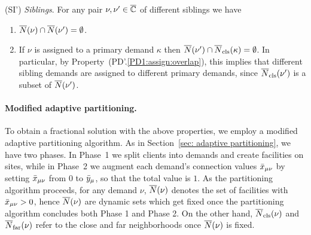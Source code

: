 \begin{description}
\begin{enumerate}
	\end{enumerate}
	
\item{(SI')} \emph{Siblings}. For any pair $\nu,\nu'\in\overline{\mathbb{C}}$ of different siblings we have
  \begin{enumerate}

	\item \label{SI1:siblings disjoint}
		  ${\overline{N}}(\nu)\cap {\overline{N}}(\nu') = \emptyset$.
		
	\item \label{SI1:primary disjoint} If $\nu$ is assigned to a primary demand $\kappa$ then
 		${\overline{N}}(\nu')\cap {\overline{N}}_{{\mbox{\scriptsize\rm cls}}}(\kappa) = \emptyset$. In particular, by Property~(PD'.\ref{PD1:assign:overlap}),
		this implies that different sibling demands are assigned to different primary demands, since ${\overline{N}}_{{\mbox{\scriptsize\rm cls}}}(\nu')$ is a subset of ${\overline{N}}(\nu')$.

	\end{enumerate}
	
\end{description}


\paragraph{Modified adaptive partitioning.}
To obtain a fractional solution with the above properties, we employ a
modified adaptive partitioning algorithm. As in Section~\ref{sec:
  adaptive partitioning}, we have two phases.  In Phase~1 we split
clients into demands and create facilities on sites, while in Phase~2
we augment each demand's connection values ${\bar x}_{\mu\nu}$ by setting
${\bar x}_{\mu\nu}$ from $0$ to ${\bar y}_{\mu}$, so that the total value is
$1$. As the partitioning algorithm proceeds, for any demand $\nu$,
${\overline{N}}(\nu)$ denotes the set of facilities with ${\bar x}_{\mu\nu} > 0$,
hence ${\overline{N}}(\nu)$ are dynamic sets which get fixed once the
partitioning algorithm concludes both Phase 1 and Phase 2. On the
other hand, ${\overline{N}}_{{\mbox{\scriptsize\rm cls}}}(\nu)$ and ${\overline{N}}_{{\mbox{\scriptsize\rm far}}}(\nu)$ refer to the close
and far neighborhoods once ${\overline{N}}(\nu)$ is fixed.

